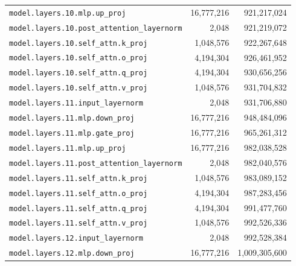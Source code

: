 \documentclass[10pt,a4paper]{article}
\begin{document}
\begin{appendices}
\begin{longtable}{p{9.5cm}rr}
\texttt{model.\allowbreak{}layers.\allowbreak{}10.\allowbreak{}mlp.\allowbreak{}up\_proj} & 16,777,216 & 921,217,024 \\
\texttt{model.\allowbreak{}layers.\allowbreak{}10.\allowbreak{}post\_attention\_layernorm} & 2,048 & 921,219,072 \\
\texttt{model.\allowbreak{}layers.\allowbreak{}10.\allowbreak{}self\_attn.\allowbreak{}k\_proj} & 1,048,576 & 922,267,648 \\
\texttt{model.\allowbreak{}layers.\allowbreak{}10.\allowbreak{}self\_attn.\allowbreak{}o\_proj} & 4,194,304 & 926,461,952 \\
\texttt{model.\allowbreak{}layers.\allowbreak{}10.\allowbreak{}self\_attn.\allowbreak{}q\_proj} & 4,194,304 & 930,656,256 \\
\texttt{model.\allowbreak{}layers.\allowbreak{}10.\allowbreak{}self\_attn.\allowbreak{}v\_proj} & 1,048,576 & 931,704,832 \\
\texttt{model.\allowbreak{}layers.\allowbreak{}11.\allowbreak{}input\_layernorm} & 2,048 & 931,706,880 \\
\texttt{model.\allowbreak{}layers.\allowbreak{}11.\allowbreak{}mlp.\allowbreak{}down\_proj} & 16,777,216 & 948,484,096 \\
\texttt{model.\allowbreak{}layers.\allowbreak{}11.\allowbreak{}mlp.\allowbreak{}gate\_proj} & 16,777,216 & 965,261,312 \\
\texttt{model.\allowbreak{}layers.\allowbreak{}11.\allowbreak{}mlp.\allowbreak{}up\_proj} & 16,777,216 & 982,038,528 \\
\texttt{model.\allowbreak{}layers.\allowbreak{}11.\allowbreak{}post\_attention\_layernorm} & 2,048 & 982,040,576 \\
\texttt{model.\allowbreak{}layers.\allowbreak{}11.\allowbreak{}self\_attn.\allowbreak{}k\_proj} & 1,048,576 & 983,089,152 \\
\texttt{model.\allowbreak{}layers.\allowbreak{}11.\allowbreak{}self\_attn.\allowbreak{}o\_proj} & 4,194,304 & 987,283,456 \\
\texttt{model.\allowbreak{}layers.\allowbreak{}11.\allowbreak{}self\_attn.\allowbreak{}q\_proj} & 4,194,304 & 991,477,760 \\
\texttt{model.\allowbreak{}layers.\allowbreak{}11.\allowbreak{}self\_attn.\allowbreak{}v\_proj} & 1,048,576 & 992,526,336 \\
\texttt{model.\allowbreak{}layers.\allowbreak{}12.\allowbreak{}input\_layernorm} & 2,048 & 992,528,384 \\
\texttt{model.\allowbreak{}layers.\allowbreak{}12.\allowbreak{}mlp.\allowbreak{}down\_proj} & 16,777,216 & 1,009,305,600 \\

\end{longtable}
\end{appendices}
\end{document}
